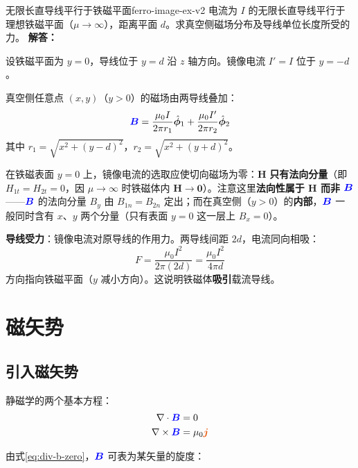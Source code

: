 \documentclass[11pt,a4paper,openany,oneside]{book}
\newcommand{\vecB}{\textcolor{blue}{\vect{B}}}
\newcommand{\vecJ}{\textcolor{cororange}{\vect{j}}}
\newcommand{\muz}{\mu_0}
\newcommand{\vect}[1]{\bm{#1}}
\newcommand{\unitvec}[1]{\hat{\vect{#1}}}
\newcommand{\curl}{\nabla\times}
\newcommand{\divg}{\nabla\cdot}
\newcommand{\difficulty}[1]{\marginnote{\textcolor{red}{\textbf{[#1]}}}}
\begin{document}
\begin{example}{无限长直导线平行于铁磁平面}{ferro-image-ex-v2}
\difficulty{提高}
电流为 $I$ 的无限长直导线平行于理想铁磁平面（$\mu \to \infty$），距离平面 $d$。求真空侧磁场分布及导线单位长度所受的力。
\tcblower
\textbf{解答：}

设铁磁平面为 $y=0$，导线位于 $y=d$ 沿 $z$ 轴方向。镜像电流 $I'=I$ 位于 $y=-d$。

真空侧任意点 $(x,y)$（$y>0$）的磁场由两导线叠加：
\[
\vecB = \frac{\muz I}{2\pi r_1}\unitvec{\phi}_1 + \frac{\muz I'}{2\pi r_2}\unitvec{\phi}_2
\]
其中 $r_1 = \sqrt{x^2+(y-d)^2}$，$r_2 = \sqrt{x^2+(y+d)^2}$。

在铁磁表面 $y=0$ 上，镜像电流的选取应使切向磁场为零：$\vect{H}$ \textbf{只有法向分量}（即 $H_{1t}=H_{2t}=0$，因 $\mu\to\infty$ 时铁磁体内 $\vect{H}\to\vect{0}$）。注意这里\textbf{法向性属于 $\vect{H}$ 而非 $\vecB$}——$\vecB$ 的法向分量 $B_y$ 由 $B_{1n}=B_{2n}$ 定出；而在真空侧（$y>0$）的\textbf{内部}，$\vecB$ 一般同时含有 $x$、$y$ 两个分量（只有表面 $y=0$ 这一层上 $B_x=0$）。

\textbf{导线受力}：镜像电流对原导线的作用力。两导线间距 $2d$，电流同向相吸：
\[
F = \frac{\muz I^2}{2\pi(2d)} = \frac{\muz I^2}{4\pi d}
\]
方向指向铁磁平面（$y$ 减小方向）。这说明铁磁体\textbf{吸引}载流导线。
\end{example}

\section{磁矢势}

\subsection{引入磁矢势}

静磁学的两个基本方程：
\begin{align}
\divg\vecB &= 0 \label{eq:div-b-zero} \\
\curl\vecB &= \muz\vecJ \label{eq:curl-b}
\end{align}

由式\eqref{eq:div-b-zero}，$\vecB$ 可表为某矢量的旋度：
\end{document}
